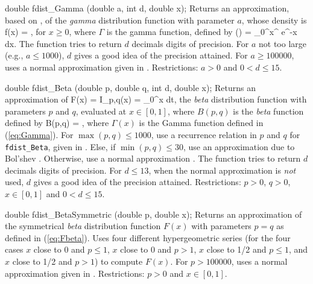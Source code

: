 double fdist_Gamma (double a, int d, double x);
\endcode
  \tab
  Returns an approximation, based on \cite{tBAT70a}, of the {\em gamma\/}
  distribution function with  parameter $a$, whose density is
  \eq
    f(x) = ,
  \endeq
  for $x\ge 0$, where $\Gamma$ is the gamma function, defined by
  \eq
    \Gamma(\alpha) = \int_0^\infty x^{} e^{-x} dx.
                                                       \label{eq:Gamma}
  \endeq
  The function tries to return $d$ decimals digits of precision.
  For $a$ not too large (e.g., $a \le 1000$),
  $d$ gives a good idea of the precision attained.
  For $a \ge 100000$, uses a normal approximation given in \cite{tPEI68a}.
   Restrictions:  $a>0$ and  $0 < d \le 15$.
  \endtab
\code


double fdist_Beta (double p, double q, int d, double x);
\endcode
  \tab
  Returns an approximation of 
  \eq
    F(x) = I_{p,q}(x) 
         = \int_0^x  dt,
  \endeq
  the {\em beta\/} distribution function with parameters $p$ and $q$, 
  evaluated at $x \in [0, 1]$, where $B(p,q)$ is the {\em beta\/} function
  defined by
  \eq
    B(p,q) = ,
  \endeq
  where $\Gamma (x)$ is the Gamma function defined in (\ref{eq:Gamma}).
  For $\max(p, q) \le 1000$, use a recurrence relation in $p$ and $q$ for
  {\tt fdist\_Beta}, given in \cite{tGAU64a,tGAU64b}. 
  Else, if $\min(p, q) \le 30$,
  use an approximation due to Bol'shev \cite{tMAR78a}.  Otherwise, use a
  normal approximation \cite{tPEI68a}.
  The function tries to return $d$ decimals digits of precision.
  For $d\le 13$, when the normal approximation is {\em not\/} used,
  $d$ gives a good idea of the precision attained.
  Restrictions:  $p>0$,  $q>0$, $x \in [0, 1]$ and $0 < d \le 15$.
  \endtab
\code


double fdist_BetaSymmetric (double p, double x);
\endcode
  \tab
  Returns an approximation of the symmetrical {\em beta\/} distribution 
  function $F(x)$ with parameters $p = q$  as defined in (\ref{eq:Fbeta}).
  Uses four different hypergeometric series 
  (for the four cases $x$ close to 0 and $p \le 1$,
     $x$ close to 0 and $p > 1$,  $x$ close to 1/2 and $p \le 1$,
  and  $x$ close to 1/2 and $p > 1$)
  to compute $F(x)$.
  For $p > 100000$, uses a normal approximation given in \cite{tPEI68a}.
  Restrictions:  $p>0$ and $x \in [0, 1]$.
  \endtab
\code


